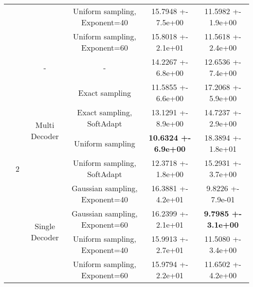 \begin{center}
\begin{table}
\begin{tabular}{||c|c|c|c|c|c||}
\cline{4-6}
 &  &  & Uniform sampling, Exponent=40 & 15.7948 +- 7.5e+00 & 11.5982 +- 1.9e+00 \\
\cline{4-6}
 &  &  & Uniform sampling, Exponent=60 & 15.8018 +- 2.1e+01 & 11.5618 +- 2.4e+00 \\
\cline{4-6}
\cline{3-6}
\cline{2-6}
 & \multirow{9}{*}{2} & \multirow{1}{*}{-} & - & 14.2267 +- 6.8e+00 & 12.6536 +- 7.4e+00 \\
\cline{4-6}
\cline{3-6}
 &  & \multirow{4}{*}{Multi Decoder} & Exact sampling & 11.5855 +- 6.6e+00 & 17.2068 +- 5.9e+00 \\
\cline{4-6}
 &  &  & Exact sampling, SoftAdapt & 13.1291 +- 8.9e+00 & 14.7237 +- 2.9e+00 \\
\cline{4-6}
 &  &  & Uniform sampling & \textbf{10.6324 +- 6.9e+00} & 18.3894 +- 1.8e+01 \\
\cline{4-6}
 &  &  & Uniform sampling, SoftAdapt & 12.3718 +- 1.8e+00 & 15.2931 +- 3.7e+00 \\
\cline{4-6}
\cline{3-6}
 &  & \multirow{4}{*}{Single Decoder} & Gaussian sampling, Exponent=40 & 16.3881 +- 4.2e+01 & 9.8226 +- 7.9e-01 \\
\cline{4-6}
 &  &  & Gaussian sampling, Exponent=60 & 16.2399 +- 2.1e+01 & \textbf{9.7985 +- 3.1e+00} \\
\cline{4-6}
 &  &  & Uniform sampling, Exponent=40 & 15.9913 +- 2.7e+01 & 11.5080 +- 3.4e+00 \\
\cline{4-6}
 &  &  & Uniform sampling, Exponent=60 & 15.9794 +- 2.2e+01 & 11.6502 +- 4.2e+00 \\
\cline{4-6}
\cline{3-6}
\cline{2-6}
\hline
\hline
\end{tabular}
\end{table}
\end{center}
